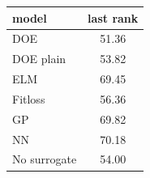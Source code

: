 \begin{tabular}{|lc|}
\hline
model & last rank\\
\hline
DOE & 51.36 \\
DOE plain & 53.82 \\
ELM & 69.45 \\
Fitloss & 56.36 \\
GP & 69.82 \\
NN & 70.18 \\
No surrogate & 54.00 \\
\hline
\end{tabular}
